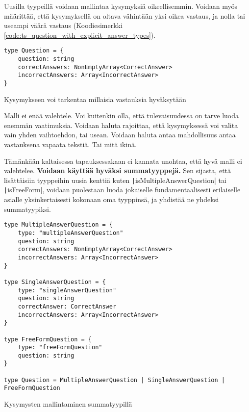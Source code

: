 Uusilla tyypeillä voidaan mallintaa kysymyksiä oikeellisemmin. Voidaan myös määrittää, että kysymyksellä on oltava vähintään yksi oikea vastaus, ja nolla tai useampi väärä vastaus (Koodiesimerkki \ref{code:ts_question_with_explicit_answer_types}).

\begin{code}
    \begin{verbatim}
type Question = {
    question: string
    correctAnswers: NonEmptyArray<CorrectAnswer>
    incorrectAnswers: Array<IncorrectAnswer>
}
    \end{verbatim}
    \caption{Kysymykseen voi tarkentaa millaisia vastauksia hyväksytään}
    \label{code:ts_question_with_explicit_answer_types}
\end{code}

Malli ei enää valehtele. Voi kuitenkin olla, että tulevaisuudessa on tarve luoda enemmän vaatimuksia. Voidaan haluta rajoittaa, että kysymyksessä voi valita vain yhden vaihtoehdon, tai usean. Voidaan haluta antaa mahdollisuus antaa vastauksena vapaata tekstiä. Tai mitä ikinä.

Tämänkään kaltaisessa tapauksessakaan ei kannata unohtaa, että hyvä malli ei valehtelee. \textbf{Voidaan käyttää hyväksi summatyyppejä.} Sen sijasta, että lisättäisiin tyyppeihin uusia kenttiä kuten \texttt|isMultipleAnswerQuestion| tai \texttt|isFreeForm|, voidaan puolestaan luoda jokaiselle fundamentaalisesti erilaiselle asialle yksinkertaisesti kokonaan oma tyyppinsä, ja yhdistää ne yhdeksi summatyypiksi.

\begin{code}
    \begin{verbatim}
type MultipleAnswerQuestion = {
    type: "multipleAnswerQuestion"
    question: string
    correctAnswers: NonEmptyArray<CorrectAnswer>
    incorrectAnswers: Array<IncorrectAnswer>
}

type SingleAnswerQuestion = {
    type: "singleAnswerQuestion"
    question: string
    correctAnswer: CorrectAnswer
    incorrectAnswers: Array<IncorrectAnswer>
}

type FreeFormQuestion = {
    type: "freeFormQuestion"
    question: string
}

type Question = MultipleAnswerQuestion | SingleAnswerQuestion | FreeFormQuestion
    \end{verbatim}
    \caption{Kysymysten mallintaminen summatyypillä}
    \label{code:ts_sum_type_nice}
\end{code}

